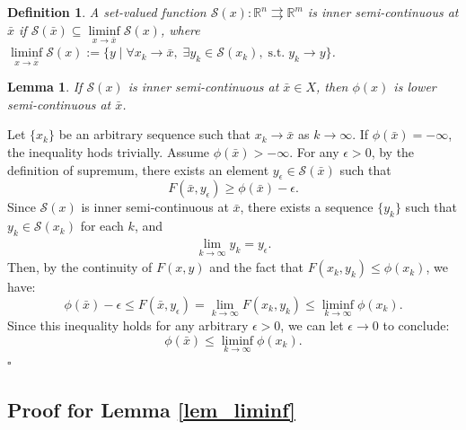 \documentclass{article}
\newtheorem{lemma}[theorem]{Lemma}
\newtheorem{definition}[theorem]{Definition}
\newenvironment{proof}[1][Proof]{\par
	\normalfont\topsep6pt\relax
	\trivlist\item[\hskip\labelsep\itshape #1.]\ignorespaces
}{%
	\hfill\ensuremath{\square}\endtrivlist
}
\def\x{x}
\def\y{y}
\begin{document}
\begin{definition}
    A set-valued function $\mathcal{S}(x): \mathbb{R}^n \rightrightarrows \mathbb{R}^m$ is inner semi-continuous at $\bar{x}$ if $\mathcal{S}(\bar{x}) \subseteq \liminf\limits_{x\to\bar{x}}\mathcal{S}(x)$, where $\liminf\limits_{x\to\bar{x}} \mathcal{S}(\x) :=\{\y\;|\;\forall\x_k\to\bar{\x},\;\exists\y_k\in\mathcal{S}(\x_k),\; \text{s.t.}\;\y_k\to\y\}$.
\end{definition}

\begin{lemma}
    If $\mathcal{S}(x)$ is inner semi-continuous at $\bar{x} \in X$, then $\phi(x)$ is lower semi-continuous at $\bar{x}$.
\end{lemma}
\begin{proof}
Let $\{x_k\}$ be an arbitrary sequence such that $x_k \rightarrow \bar{x}$ as $k \rightarrow \infty$. If $\phi(\bar{x}) = - \infty$, the inequality hods trivially. Assume $\phi(\bar{x})> -\infty$. For any $\epsilon > 0$, by the definition of supremum, there exists an element $y_\epsilon \in \mathcal{S}(\bar{x})$ such that $$F(\bar{x}, y_\epsilon) \ge \phi(\bar{x}) - \epsilon. $$ 
Since $\mathcal{S}(x)$ is inner semi-continuous at $\bar{x}$, there exists a sequence $\{y_k\}$ such that ${y}_k\in\mathcal{S}(x_k)$ for each $k$, and
 		\begin{align*}
 			\lim\limits_{k\to\infty} y_k = y_\epsilon.
 		\end{align*}  
    Then, by the continuity of $F(x,y)$ and the fact that $F(\x_k,y_k) \le \phi(x_k)$, we have:
    \begin{equation}
        \phi(\bar{x}) - \epsilon \le F(\bar{x}, y_\epsilon) = \lim\limits_{k\to\infty}F(\x_k,y_k) \le \liminf_{k \rightarrow \infty} \phi(x_k).
    \end{equation}
    Since this inequality holds for any arbitrary $\epsilon > 0$, we can let $\epsilon \rightarrow 0$ to conclude:
\[
\phi(\bar{x}) \le \liminf_{k \rightarrow \infty} \phi(x_k).
\]
\end{proof}

\subsection{Proof for Lemma \ref{lem_liminf}}
\end{document}
